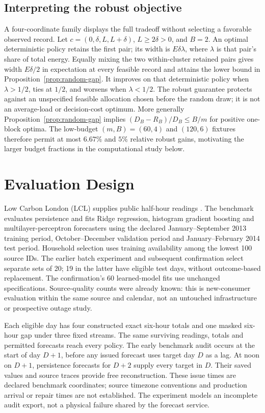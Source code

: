 \documentclass[12pt]{article}
\begin{document}
\subsection{Interpreting the robust objective}
A four-coordinate family displays the full tradeoff without selecting a
favorable observed record. Let $c=(0,\delta,L,L+\delta)$, $L\geq2\delta>0$,
and $B=2$. An optimal deterministic policy retains the first pair; its width
is $E\delta\lambda$, where $\lambda$ is that pair's share of total energy.
Equally mixing the two within-cluster retained pairs gives width
$E\delta/2$ in expectation at every feasible record and attains the lower
bound in Proposition~\ref{prop:random-gap}. It improves on that deterministic
policy when $\lambda>1/2$, ties at $1/2$, and worsens when $\lambda<1/2$.
The robust guarantee protects against an unspecified feasible allocation
chosen before the random draw; it is not an average-load or decision-cost
optimum. More generally Proposition~\ref{prop:random-gap} implies
$(D_B-R_B)/D_B\leq B/m$ for positive one-block optima. The low-budget
$(m,B)=(60,4)$ and $(120,6)$ fixtures therefore permit at most $6.67\%$
and $5\%$ relative robust gains, motivating the larger budget fractions in
the computational study below.

\section{Evaluation Design}
\label{sec:evaluation-overview}
Low Carbon London (LCL) supplies public half-hour readings \cite{lcl}.
The benchmark evaluates persistence and fits Ridge regression, histogram
gradient boosting and multilayer-perceptron forecasters using the declared
January--September 2013 training period, October--December validation
period and January--February 2014 test period. Household selection uses
training availability among the lowest 100 source IDs. The earlier batch
experiment and subsequent confirmation select separate sets of 20;
19 in the latter have eligible test days, without outcome-based
replacement. The confirmation's 60 learned-model fits use unchanged
specifications. Source-quality counts were already known: this is
new-consumer evaluation within the same source and calendar, not an
untouched infrastructure or prospective outage study.

Each eligible day has four constructed exact six-hour totals and one
masked six-hour gap under three fixed streams. The same surviving
readings, totals and permitted forecasts reach every policy. The early
benchmark audit occurs at the start of day $D+1$, before any issued
forecast uses target day $D$ as a lag. At noon on $D+1$, persistence
forecasts for $D+2$ supply every target in $D$. Their saved values and
source traces provide free reconstruction. These issue times are declared
benchmark coordinates; source timezone conventions and production arrival
or repair times are not established. The experiment models an incomplete
audit export, not a physical failure shared by the forecast service.
\end{document}
